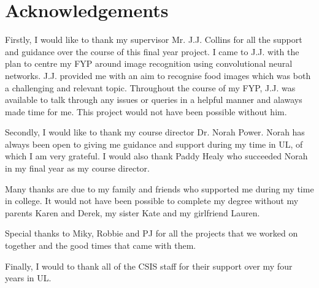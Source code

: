 \section*{Acknowledgements}
Firstly, I would like to thank my supervisor Mr. J.J. Collins for all the support and guidance over the course of this final year project.
I came to J.J. with the plan to centre my FYP around image recognition using convolutional neural networks.
J.J. provided me with an aim to recognise food images which was both a challenging and relevant topic.
Throughout the course of my FYP, J.J. was available to talk through any issues or queries in a helpful manner and alaways made time for me.
This project would not have been possible without him.

Secondly, I would like to thank my course director Dr. Norah Power.
Norah has always been open to giving me guidance and support during my time in UL, of which I am very grateful.
I would also thank Paddy Healy who succeeded Norah in my final year as my course director.

Many thanks are due to my family and friends who supported me during my time in college.
It would not have been possible to complete my degree without my parents Karen and Derek, my sister Kate and my girlfriend Lauren.

Special thanks to Miky, Robbie and PJ for all the projects that we worked on together and the good times that came with them.

Finally, I would to thank all of the CSIS staff for their support over my four years in UL.